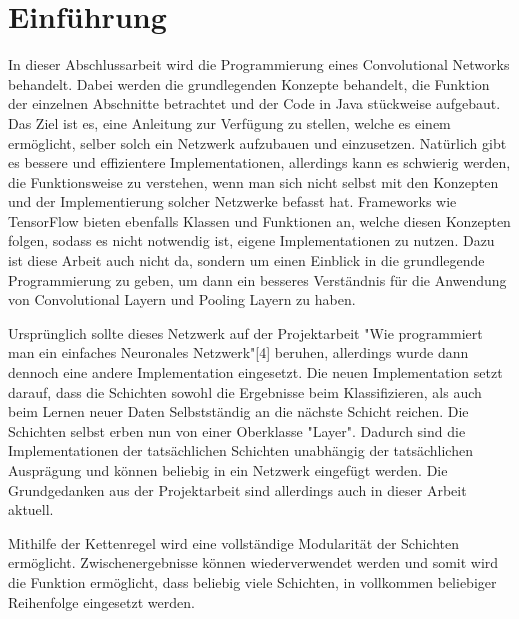 \documentclass[12pt]{article}
\begin{document}
\cleardoublepage
\thispagestyle{empty}
\tableofcontents
\thispagestyle{empty}
\cleardoublepage
\setcounter{page}{1}

\section{Einführung}
In dieser Abschlussarbeit wird die Programmierung eines Convolutional Networks  behandelt. Dabei werden die grundlegenden Konzepte behandelt, die Funktion der einzelnen Abschnitte betrachtet und der Code in Java stückweise aufgebaut. Das Ziel ist es, eine Anleitung zur Verfügung zu stellen, welche es einem ermöglicht, selber solch ein Netzwerk aufzubauen und einzusetzen. Natürlich gibt es bessere und effizientere Implementationen, allerdings kann es schwierig werden, die Funktionsweise zu verstehen, wenn man sich nicht selbst mit den Konzepten und der Implementierung solcher Netzwerke befasst hat. Frameworks wie TensorFlow bieten ebenfalls Klassen und Funktionen an, welche diesen Konzepten folgen, sodass es nicht notwendig ist, eigene Implementationen zu nutzen. Dazu ist diese Arbeit auch nicht da, sondern um einen Einblick in die grundlegende Programmierung zu geben, um dann ein besseres Verständnis für die Anwendung von Convolutional Layern und Pooling Layern zu haben.

Ursprünglich sollte dieses Netzwerk auf der Projektarbeit "Wie programmiert man ein einfaches Neuronales Netzwerk"[4] beruhen, allerdings wurde dann dennoch eine andere Implementation eingesetzt. Die neuen Implementation setzt darauf, dass die Schichten sowohl die Ergebnisse beim Klassifizieren, als auch beim Lernen neuer Daten Selbstständig an die nächste Schicht reichen. Die Schichten selbst erben nun von einer Oberklasse "Layer". Dadurch sind die Implementationen der tatsächlichen Schichten unabhängig der tatsächlichen Ausprägung und können beliebig in ein Netzwerk eingefügt werden. Die Grundgedanken aus der Projektarbeit sind allerdings auch in dieser Arbeit aktuell.

Mithilfe der Kettenregel wird eine vollständige Modularität der Schichten ermöglicht. Zwischenergebnisse können wiederverwendet werden und somit wird die Funktion ermöglicht, dass beliebig viele Schichten, in vollkommen beliebiger Reihenfolge eingesetzt werden. 
\end{document}
